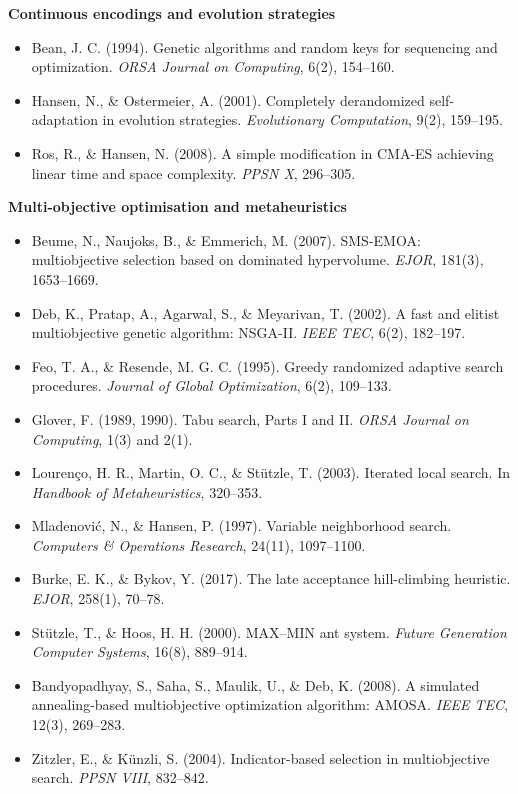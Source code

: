 \documentclass[
  11pt,
]{article}
\providecommand{\tightlist}{%
  \setlength{\itemsep}{0pt}\setlength{\parskip}{0pt}}
\begin{document}
\textbf{Continuous encodings and evolution strategies}

\begin{itemize}
\tightlist
\item
  Bean, J. C. (1994). Genetic algorithms and random keys for sequencing
  and optimization. \emph{ORSA Journal on Computing}, 6(2), 154--160.
\item
  Hansen, N., \& Ostermeier, A. (2001). Completely derandomized
  self-adaptation in evolution strategies. \emph{Evolutionary
  Computation}, 9(2), 159--195.
\item
  Ros, R., \& Hansen, N. (2008). A simple modification in CMA-ES
  achieving linear time and space complexity. \emph{PPSN X}, 296--305.
\end{itemize}

\textbf{Multi-objective optimisation and metaheuristics}

\begin{itemize}
\tightlist
\item
  Beume, N., Naujoks, B., \& Emmerich, M. (2007). SMS-EMOA:
  multiobjective selection based on dominated hypervolume. \emph{EJOR},
  181(3), 1653--1669.
\item
  Deb, K., Pratap, A., Agarwal, S., \& Meyarivan, T. (2002). A fast and
  elitist multiobjective genetic algorithm: NSGA-II. \emph{IEEE TEC},
  6(2), 182--197.
\item
  Feo, T. A., \& Resende, M. G. C. (1995). Greedy randomized adaptive
  search procedures. \emph{Journal of Global Optimization}, 6(2),
  109--133.
\item
  Glover, F. (1989, 1990). Tabu search, Parts I and II. \emph{ORSA
  Journal on Computing}, 1(3) and 2(1).
\item
  Lourenço, H. R., Martin, O. C., \& Stützle, T. (2003). Iterated local
  search. In \emph{Handbook of Metaheuristics}, 320--353.
\item
  Mladenović, N., \& Hansen, P. (1997). Variable neighborhood search.
  \emph{Computers \& Operations Research}, 24(11), 1097--1100.
\item
  Burke, E. K., \& Bykov, Y. (2017). The late acceptance hill-climbing
  heuristic. \emph{EJOR}, 258(1), 70--78.
\item
  Stützle, T., \& Hoos, H. H. (2000). MAX--MIN ant system. \emph{Future
  Generation Computer Systems}, 16(8), 889--914.
\item
  Bandyopadhyay, S., Saha, S., Maulik, U., \& Deb, K. (2008). A
  simulated annealing-based multiobjective optimization algorithm:
  AMOSA. \emph{IEEE TEC}, 12(3), 269--283.
\item
  Zitzler, E., \& Künzli, S. (2004). Indicator-based selection in
  multiobjective search. \emph{PPSN VIII}, 832--842.
\end{itemize}
\end{document}
